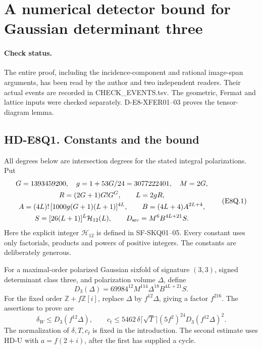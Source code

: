 \section{A numerical detector bound for Gaussian determinant three}
\label{sec:e8-detector-degree}

\paragraph{Check status.}
The entire proof, including the incidence-component and rational
image-span arguments, has been read by the author and two independent
readers. Their actual events are recorded in CHECK\_EVENTS.tsv.
The geometric, Fermat and lattice inputs were checked separately.
D-E8-XFER01--03 proves the tensor-diagram lemma.

\subsection*{HD-E8Q1. Constants and the bound}

All degrees below are intersection degrees for the stated integral
polarizations. Put
\[
\begin{gathered}
 G=1393459200,\quad g=1+53G/24=3077222401,\quad M=2G,\\
 R=(2G+1)G!G^G,\qquad L=2gR,\\
 A=(4L)!\,[1000g(G+1)(L+1)]^{4L},\qquad
 B=(4L+4)A^{2L+4},\\
 S=[26(L+1)]^L\mathcal H_{12}(L),\qquad
 D_{\rm src}=M^6B^{4L+21}S.
\end{gathered}                                                    \tag{E8Q.1}
\]
Here the explicit integer \(\mathcal H_{12}\) is defined in
SF-SKQ01--05. Every constant uses only factorials, products and
powers of positive integers. The constants are deliberately generous.

For a maximal-order polarized Gaussian sixfold of signature
\((3,3)\), signed determinant class three, and polarization volume
\(\Delta\), define
\[
 \boxed{D_3(\Delta)=69984^{12}M^{114}\Delta^{18}B^{4L+21}S.}       \tag{E8Q.2}
\]
For the fixed order \(\mathbb Z+f\mathbb Z[i]\), replace
\(\Delta\) by \(f^{12}\Delta\), giving a factor \(f^{216}\).
The assertions to prove are
\[
 \delta_W\le D_3(f^{12}\Delta),\qquad
 c_t\le5462\,\delta\lceil\sqrt T\rceil
              (5f^2)^{24}D_3(f^{12}\Delta)^2.                   \tag{E8Q.3}
\]
The normalization of \(\delta,T,c_t\) is fixed in the introduction.
The second estimate uses HD-U with \(a=f(2+i)\), after the first
has supplied a cycle.

